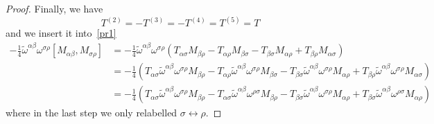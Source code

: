\begin{proof}
        Finally, we have
        \begin{equation*}
            T^(2) = - T^{(3)} = - T^{(4)} = T^{(5)} = T
        \end{equation*}
        and we insert it into~\eqref{pr1}
        \begin{equation*}
        \begin{aligned}
            - \frac{1}{4} \tilde \omega^{\alpha \beta} \omega^{\sigma \rho}[M_{\alpha \beta}, M_{\sigma \rho}] & = - \frac{1}{4} \tilde \omega^{\alpha \beta} \omega^{\sigma \rho} (T_{\alpha\sigma} M_{\beta\rho} - T_{\alpha\rho} M_{\beta\sigma} - T_{\beta\sigma} M_{\alpha\rho} + T_{\beta\rho} M_{\alpha\sigma }) \\ & = - \frac{1}{4} (T_{\alpha\sigma} \tilde \omega^{\alpha \beta} \omega^{\sigma \rho} M_{\beta\rho} - T_{\alpha\rho} \tilde \omega^{\alpha \beta} \omega^{\sigma \rho} M_{\beta\sigma} - T_{\beta\sigma} \tilde \omega^{\alpha \beta} \omega^{\sigma \rho} M_{\alpha\rho} + T_{\beta\rho} \tilde \omega^{\alpha \beta} \omega^{\sigma \rho} M_{\alpha\sigma }) \\ &  = - \frac{1}{4} (T_{\alpha\sigma} \tilde \omega^{\alpha \beta} \omega^{\sigma \rho} M_{\beta\rho} - T_{\alpha\sigma} \tilde \omega^{\alpha \beta} \omega^{\rho \sigma} M_{\beta\rho} - T_{\beta\sigma} \tilde \omega^{\alpha \beta} \omega^{\sigma \rho} M_{\alpha\rho} + T_{\beta\sigma} \tilde \omega^{\alpha \beta} \omega^{\rho \sigma} M_{\alpha\rho })
        \end{aligned}
        \end{equation*}
        where in the last step we only relabelled $\sigma \leftrightarrow \rho$. 


\end{proof}
